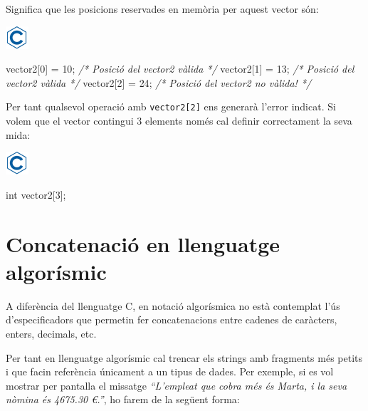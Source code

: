 \documentclass[]{book}
\newenvironment{Shaded}{\begin{snugshade}}{\end{snugshade}}
\newcommand{\CommentTok}[1]{\textcolor[rgb]{0.56,0.35,0.01}{\textit{#1}}}
\newcommand{\DataTypeTok}[1]{\textcolor[rgb]{0.13,0.29,0.53}{#1}}
\newcommand{\DecValTok}[1]{\textcolor[rgb]{0.00,0.00,0.81}{#1}}
\newcommand{\NormalTok}[1]{#1}
\begin{document}
Significa que les posicions reservades en memòria per aquest vector són:

\includegraphics{./img/c.png}

\begin{Shaded}
\begin{Highlighting}[]
\NormalTok{vector2[}\DecValTok{0}\NormalTok{] = }\DecValTok{10}\NormalTok{;  }\CommentTok{/* Posició del vector2 vàlida */}
\NormalTok{vector2[}\DecValTok{1}\NormalTok{] = }\DecValTok{13}\NormalTok{;  }\CommentTok{/* Posició del vector2 vàlida */}
\NormalTok{vector2[}\DecValTok{2}\NormalTok{] = }\DecValTok{24}\NormalTok{;  }\CommentTok{/* Posició del vector2 no vàlida! */}
\end{Highlighting}
\end{Shaded}

Per tant qualsevol operació amb \texttt{vector2{[}2{]}} ens generarà l'error indicat. Si volem que el vector contingui 3 elements només cal definir correctament la seva mida:

\includegraphics{./img/c.png}

\begin{Shaded}
\begin{Highlighting}[]
\DataTypeTok{int}\NormalTok{ vector2[}\DecValTok{3}\NormalTok{];}
\end{Highlighting}
\end{Shaded}

\hypertarget{concatenacio-en-llenguatge-algorismic}{%
\section{Concatenació en llenguatge algorísmic}\label{concatenacio-en-llenguatge-algorismic}}

A diferència del llenguatge C, en notació algorísmica no està contemplat l'ús d'especificadors que permetin fer concatenacions entre cadenes de caràcters, enters, decimals, etc.

Per tant en llenguatge algorísmic cal trencar els strings amb fragments més petits i que facin referència únicament a un tipus de dades. Per exemple, si es vol mostrar per pantalla el missatge \emph{``L'empleat que cobra més és Marta, i la seva nòmina és 4675.30 €.''}, ho farem de la següent forma:
\end{document}
